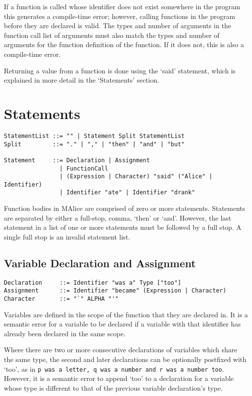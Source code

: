 \documentclass[a4wide, 11pt]{article}
\begin{document}
If a function is called whose identifier does not exist somewhere in the program this generates a compile-time error; however, calling functions in the program before they are declared is valid. The types and number of arguments in the function call list of arguments must also match the types and number of arguments for the function definition of the function. If it does not, this is also a compile-time error.

Returning a value from a function is done using the `said' statement, which is explained in more detail in the `Statements' section.

\section{Statements}

\begin{verbatim}
StatementList ::= "" | Statement Split StatementList
Split         ::= "." | "," | "then" | "and" | "but"

Statement     ::= Declaration | Assignment
                | FunctionCall
                | (Expression | Character) "said" ("Alice" | Identifier)
                | Identifier "ate" | Identifier "drank"
\end{verbatim}

Function bodies in MAlice are comprised of zero or more statements. Statements are separated by either a full-stop, comma, `then' or `and'. However, the last statement in a list of one or more statements must be followed by a full stop. A single full stop is an invalid statement list.

\subsection{Variable Declaration and Assignment}

\begin{verbatim}
Declaration     ::= Identifier "was a" Type ["too"]
Assignment      ::= Identifier "became" (Expression | Character)
Character       ::= "`" ALPHA "'"
\end{verbatim}

Variables are defined in the scope of the function that they are declared in. It is a semantic error for a variable to be declared if a variable with that identifier has already been declared in the same scope.

Where there are two or more consecutive declarations of variables which share the same type, the second and later declarations can be optionally postfixed with `too', as in \texttt{p was a letter, q was a number and r was a number too}. However, it is a semantic error to append `too' to a declaration for a variable whose type is different to that of the previous variable declaration's type.
\end{document}
